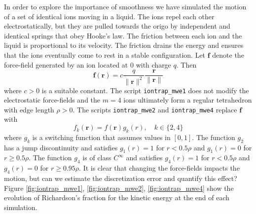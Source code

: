 \documentclass[runningheads]{llncs}
\begin{document}
In order to explore the importance of smoothness we have simulated the motion of a set of identical ions moving in a liquid. The ions repel each other electrostatically, but they are pulled towards the origo by independent and identical springs that obey Hooke's law. The friction between each ion and the liquid is proportional to its velocity. The friction drains the energy and ensures that the ions eventually come to rest in a stable configuration. 
Let $\bm{f}$ denote the force-field generated by an ion located at $0$ with charge $q$. Then
\begin{equation}
  \bm{f}(\bm{r}) = c \frac{q}{\|\bm{r}\|^2} \frac{\bm{r}}{\|\bm{r}\|}
\end{equation}
where $c > 0$ is a suitable constant. The script {\tt iontrap\_mwe1} does not modify the electrostatic force-fields and the $m=4$ ions ultimately form a regular tetrahedron with edge length $\rho > 0$.
The scripts {\tt iontrap\_mwe2} and {\tt iontrap\_mwe4} replace $\bm{f}$ with
\begin{equation}
  f_k(\bm{r}) = f(\bm{r}) g_k(r), \quad k \in \{2, 4\}
\end{equation}
where $g_k$ is a switching function that assumes values in $[0,1]$. The function $g_2$ has a jump discontinuity and satisfies $g_1(r) = 1$ for $r < 0.5 \rho$ and $g_1(r) = 0$ for $r \ge 0.5 \rho$. The function $g_4$ is of class $C^\infty$ and satisfies $g_4(r) = 1$ for $r < 0.5 \rho$ and $g_4(r) = 0$ for $r \ge 0.95 \rho$. It is clear that changing the force-fields impacts the motion, but can we estimate the discretization error and quantify this effect? Figure \ref{fig:iontrap_mwe1}, \ref{fig:iontrap_mwe2}, \ref{fig:iontrap_mwe4} show the evolution of Richardson's fraction for the kinetic energy at the end of each simulation.
\end{document}
